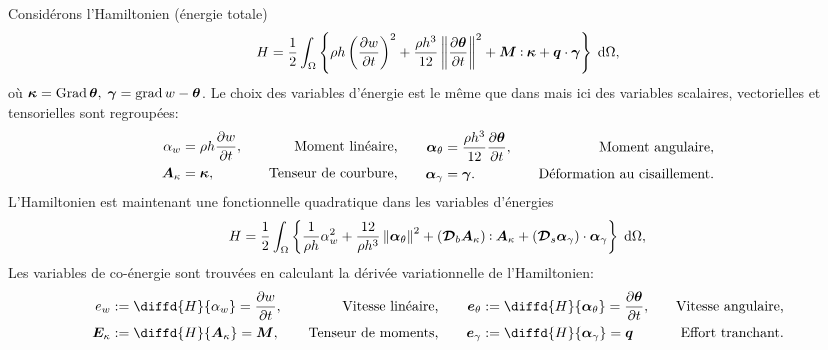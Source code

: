Considérons l'Hamiltonien (énergie totale)
\begin{equation*}
H = \frac{1}{2} \int_{\Omega}  \left\{ \rho h \left(\diffp{w}{t} \right)^2 + \frac{\rho h^3}{12} \norm{\diffp{\bm{\theta}}{t}}^2 +   \bm{M} \cddot \bm{\kappa} + \bm{q} \cdot \bm{\gamma}  \right\}  \d\Omega, 
\end{equation*}
où $\bm{\kappa} = \operatorname*{Grad} \bm{\theta}, \; \bm{\gamma} = \operatorname*{grad} w - \bm{\theta}$. Le choix des variables d'énergie est le même que dans \cite{macchelli2005mindlin} mais ici des variables scalaires, vectorielles et tensorielles sont regroupées:
\begin{equation*}
\begin{aligned}
\alpha_w &= \rho h \diffp{w}{t}, \quad &\text{Moment linéaire,} \\
\bm{A}_{\kappa} &= \bm{\kappa}, \quad &\text{Tenseur de courbure,} \\
\end{aligned} \qquad
\begin{aligned}
\bm\alpha_{\theta} &=  \frac{\rho h^3}{12} \diffp{\bm{\theta}}{t}, \quad &\text{Moment angulaire,}\\
\bm\alpha_{\gamma} &= \bm{\gamma}. \quad &\text{Déformation au cisaillement.}\\
\end{aligned}
\end{equation*}
L'Hamiltonien est maintenant une fonctionnelle quadratique dans les variables d'énergies
\begin{equation*}
H = \frac{1}{2} \int_{\Omega}  \left\{ \frac{1}{\rho h}\alpha_w^2 + \frac{12}{\rho h^3} \norm{\bm{\alpha}_{\theta}}^2 + (\bm{\mathcal{D}}_b \bm{A}_\kappa) \cddot \bm{A}_\kappa + (\bm{\mathcal{D}}_s \bm{\alpha}_\gamma) \cdot  \bm{\alpha}_\gamma  \right\}  \d\Omega, 
\end{equation*}
Les variables de co-énergie sont trouvées en calculant la dérivée variationnelle de l'Hamiltonien:
\begin{equation*}
\begin{aligned}
e_w &:= \diffd{H}{\alpha_w} = \diffp{w}{t},  \quad &\text{Vitesse linéaire,} \\
\bm{E}_{\kappa} &:= \diffd{H}{\bm{A}_{\kappa}} = \bm{M}, \quad &\text{Tenseur de moments,}\\
\end{aligned} \qquad
\begin{aligned}
\bm{e}_{\theta} &:= \diffd{H}{\bm\alpha_{\theta}} = \diffp{\bm{\theta}}{t}, \quad &\text{Vitesse angulaire,}  \\
\bm{e}_{\gamma} &:= \diffd{H}{\bm\alpha_{\gamma}} = \bm{q} \quad &\text{Effort tranchant.} \\
\end{aligned}
\end{equation*}
